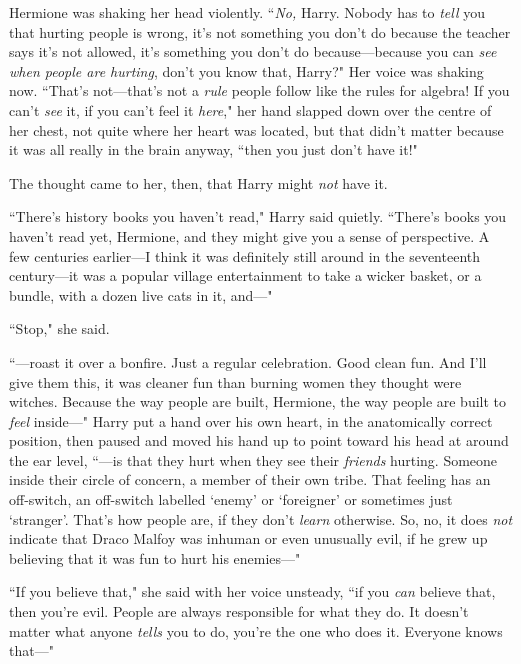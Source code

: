 Hermione was shaking her head violently. ``\emph{No,} Harry. Nobody has to \emph{tell} you that hurting people is wrong, it's not something you don't do because the teacher says it's not allowed, it's something you don't do because—because you can \emph{see when people are hurting}, don't you know that, Harry?" Her voice was shaking now. ``That's not—that's not a \emph{rule} people follow like the rules for algebra! If you can't \emph{see} it, if you can't feel it \emph{here}," her hand slapped down over the centre of her chest, not quite where her heart was located, but that didn't matter because it was all really in the brain anyway, ``then you just don't have it!"

The thought came to her, then, that Harry might \emph{not} have it.

``There's history books you haven't read," Harry said quietly. ``There's books you haven't read yet, Hermione, and they might give you a sense of perspective. A few centuries earlier—I think it was definitely still around in the seventeenth century—it was a popular village entertainment to take a wicker basket, or a bundle, with a dozen live cats in it, and—"

``Stop," she said.

``—roast it over a bonfire. Just a regular celebration. Good clean fun. And I'll give them this, it was cleaner fun than burning women they thought were witches. Because the way people are built, Hermione, the way people are built to \emph{feel} inside—" Harry put a hand over his own heart, in the anatomically correct position, then paused and moved his hand up to point toward his head at around the ear level, ``—is that they hurt when they see their \emph{friends} hurting. Someone inside their circle of concern, a member of their own tribe. That feeling has an off-switch, an off-switch labelled `enemy' or `foreigner' or sometimes just `stranger'. That's how people are, if they don't \emph{learn} otherwise. So, no, it does \emph{not} indicate that Draco Malfoy was inhuman or even unusually evil, if he grew up believing that it was fun to hurt his enemies—"

``If you believe that," she said with her voice unsteady, ``if you \emph{can} believe that, then you're evil. People are always responsible for what they do. It doesn't matter what anyone \emph{tells} you to do, you're the one who does it. Everyone knows that—"


